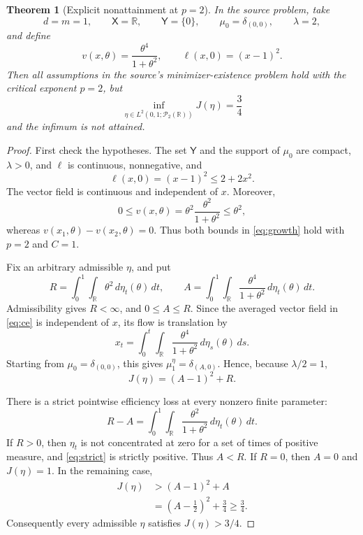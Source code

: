 \documentclass[11pt]{article}
\newtheorem{theorem}{Theorem}
\newcommand{\R}{\mathbb R}
\newcommand{\Ptwo}{\mathcal P_2}
\begin{document}
\begin{theorem}[Explicit nonattainment at \(p=2\)]\label{thm:main}
In the source problem, take
\[
 d=m=1,\qquad \mathsf X=\R,\qquad \mathsf Y=\{0\},\qquad
 \mu_0=\delta_{(0,0)},\qquad \lambda=2,
\]
and define
\begin{equation}\label{eq:data}
 v(x,\theta)=\frac{\theta^4}{1+\theta^2},
 \qquad
 \ell(x,0)=(x-1)^2.
\end{equation}
Then all assumptions in the source's minimizer-existence problem hold with
the critical exponent \(p=2\), but
\[
 \inf_{\eta\in L^2(0,1;\Ptwo(\R))}J(\eta)=\frac34
\]
and the infimum is not attained.
\end{theorem}

\begin{proof}
First check the hypotheses. The set \(\mathsf Y\) and the support of \(\mu_0\)
are compact, \(\lambda>0\), and \(\ell\) is continuous, nonnegative, and
\[
 \ell(x,0)=(x-1)^2\leq 2+2x^2.
\]
The vector field is continuous and independent of \(x\). Moreover,
\[
 0\leq v(x,\theta)=\theta^2\frac{\theta^2}{1+\theta^2}
 \leq \theta^2,
\]
whereas
\(v(x_1,\theta)-v(x_2,\theta)=0\). Thus both bounds in
\eqref{eq:growth} hold with \(p=2\) and \(C=1\).

Fix an arbitrary admissible \(\eta\), and put
\begin{equation}\label{eq:AR}
 R=\int_0^1\int_\R\theta^2\,d\eta_t(\theta)\,dt,
 \qquad
 A=\int_0^1\int_\R\frac{\theta^4}{1+\theta^2}
 \,d\eta_t(\theta)\,dt.
\end{equation}
Admissibility gives \(R<\infty\), and \(0\leq A\leq R\). Since the
averaged vector field in \eqref{eq:ce} is independent of \(x\), its flow is
translation by
\[
 x_t=\int_0^t\int_\R\frac{\theta^4}{1+\theta^2}
 \,d\eta_s(\theta)\,ds.
\]
Starting from \(\mu_0=\delta_{(0,0)}\), this gives
\(\mu_1^\eta=\delta_{(A,0)}\). Hence, because \(\lambda/2=1\),
\begin{equation}\label{eq:JAR}
 J(\eta)=(A-1)^2+R.
\end{equation}

There is a strict pointwise efficiency loss at every nonzero finite
parameter:
\begin{equation}\label{eq:strict}
 R-A=\int_0^1\int_\R\frac{\theta^2}{1+\theta^2}
 \,d\eta_t(\theta)\,dt.
\end{equation}
If \(R>0\), then \(\eta_t\) is not concentrated at zero for a set of times
of positive measure, and \eqref{eq:strict} is strictly positive. Thus
\(A<R\). If \(R=0\), then \(A=0\) and \(J(\eta)=1\). In the remaining case,
\begin{align*}
 J(\eta)
 &>(A-1)^2+A\\
 &=\left(A-\frac12\right)^2+\frac34
 \geq\frac34.
\end{align*}
Consequently every admissible \(\eta\) satisfies \(J(\eta)>3/4\).


\end{proof}
\end{document}
